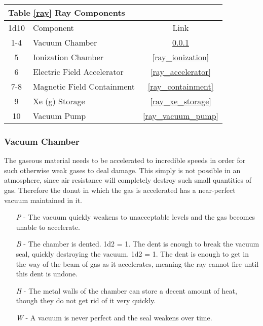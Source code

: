 \documentclass[a4paper]{article}
\begin{document}
\vspace{0.5cm} \hspace{0.25\linewidth}
\begin{tabular}{@{} | c | l | c | @{}}
\toprule
\multicolumn{3}{|l|}{Table \ref{ray} Ray Components} \\
\toprule
1d10 & Component & Link \\
\midrule
1-4 & Vacuum Chamber & \ref{ray_chamber} \\
5 & Ionization Chamber & \ref{ray_ionization} \\
6 & Electric Field Accelerator & \ref{ray_accelerator} \\
7-8 & Magnetic Field Containment & \ref{ray_containment} \\
9 & Xe (g) Storage & \ref{ray_xe_storage} \\
10 & Vacuum Pump & \ref{ray_vacuum_pump} \\
\bottomrule
\end{tabular}

\hspace{-18pt} \subsubsection{Vacuum Chamber} \label{ray_chamber} \vspace{-0.2cm}
The gaseous material needs to be accelerated to incredible speeds in order for such otherwise weak gases to deal damage. This simply is not possible in an atmosphere, since air resistance will completely destroy such small quantities of gas. Therefore the donut in which the gas is accelerated has a near-perfect vacuum maintained in it.
\begin{enumerate}
\item [\textit{P}] - The vacuum quickly weakens to unacceptable levels and the gas becomes unable to accelerate.
\item [\textit{B}] - The chamber is dented. \newline \hspace*{3pt} 1d2 = 1. The dent is enough to break the vacuum seal, quickly destroying the vacuum. \newline \hspace*{3pt} 1d2 = 1. The dent is enough to get in the way of the beam of gas as it accelerates, meaning the ray cannot fire until this dent is undone.
\item [\textit{H}] - The metal walls of the chamber can store a decent amount of heat, though they do not get rid of it very quickly.
\item [\textit{W}] - A vacuum is never perfect and the seal weakens over time. 
\end{enumerate}
\end{document}
